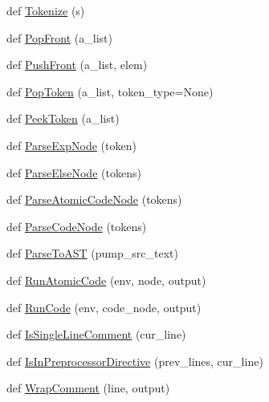 \begin{DoxyCompactItemize}
\item 
def \mbox{\hyperlink{namespacegoogletest_1_1scripts_1_1pump_a53a997afde45baf7a888d5f4db9a448e}{Tokenize}} (s)
\item 
def \mbox{\hyperlink{namespacegoogletest_1_1scripts_1_1pump_a132afc161c9b813baeb218a3a76c78d7}{Pop\+Front}} (a\+\_\+list)
\item 
def \mbox{\hyperlink{namespacegoogletest_1_1scripts_1_1pump_affc8b8f56f6f4ed24f70b9af7a1d8268}{Push\+Front}} (a\+\_\+list, elem)
\item 
def \mbox{\hyperlink{namespacegoogletest_1_1scripts_1_1pump_a1c500eec301f61d9374deb360a38663c}{Pop\+Token}} (a\+\_\+list, token\+\_\+type=None)
\item 
def \mbox{\hyperlink{namespacegoogletest_1_1scripts_1_1pump_a237f7371eeeeaee15ee3260f48c52a53}{Peek\+Token}} (a\+\_\+list)
\item 
def \mbox{\hyperlink{namespacegoogletest_1_1scripts_1_1pump_a0e7917de9cb576924bd5987d70e1c9ee}{Parse\+Exp\+Node}} (token)
\item 
def \mbox{\hyperlink{namespacegoogletest_1_1scripts_1_1pump_aac33e9fc39fb94b9ddefed53767d00fc}{Parse\+Else\+Node}} (tokens)
\item 
def \mbox{\hyperlink{namespacegoogletest_1_1scripts_1_1pump_a68411d8ccc9ef6665fa735966e1d5c98}{Parse\+Atomic\+Code\+Node}} (tokens)
\item 
def \mbox{\hyperlink{namespacegoogletest_1_1scripts_1_1pump_ac507a68162dbbb79b7ca23e5aad21fca}{Parse\+Code\+Node}} (tokens)
\item 
def \mbox{\hyperlink{namespacegoogletest_1_1scripts_1_1pump_adc11d526c29ce7f4fe97fddaa5b7af6d}{Parse\+To\+A\+ST}} (pump\+\_\+src\+\_\+text)
\item 
def \mbox{\hyperlink{namespacegoogletest_1_1scripts_1_1pump_a4dec014b290e434e2e1380cf3646d499}{Run\+Atomic\+Code}} (env, node, output)
\item 
def \mbox{\hyperlink{namespacegoogletest_1_1scripts_1_1pump_a645cff5f4a7de53cc1dbe113376f9780}{Run\+Code}} (env, code\+\_\+node, output)
\item 
def \mbox{\hyperlink{namespacegoogletest_1_1scripts_1_1pump_af515e40b64348bf921e5eaa6f2d551f4}{Is\+Single\+Line\+Comment}} (cur\+\_\+line)
\item 
def \mbox{\hyperlink{namespacegoogletest_1_1scripts_1_1pump_ac61b8df31b383d3c0aa0b45449264358}{Is\+In\+Preprocessor\+Directive}} (prev\+\_\+lines, cur\+\_\+line)
\item 
def \mbox{\hyperlink{namespacegoogletest_1_1scripts_1_1pump_a74946252fc72df527c45ecf228d5328f}{Wrap\+Comment}} (line, output)

\end{DoxyCompactItemize}
